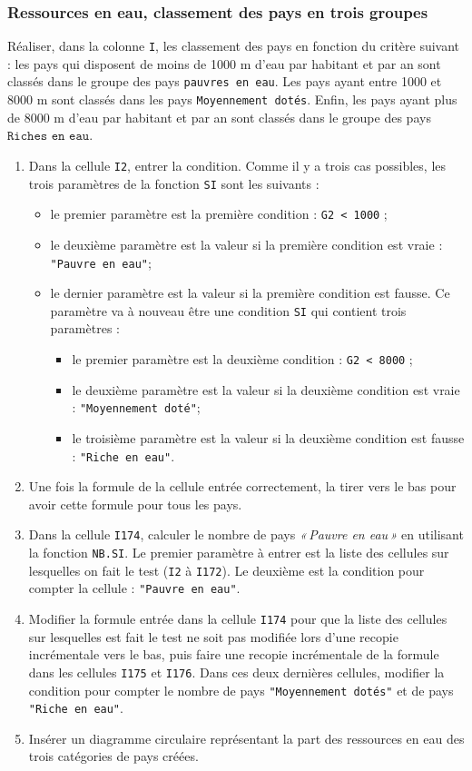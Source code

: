 \subsubsection{Ressources en eau, classement des pays en trois groupes}

Réaliser, dans la colonne \texttt{I}, les classement des pays en fonction du critère suivant : les pays qui disposent de moins de 1000 m d'eau par habitant et par an sont classés dans le groupe des pays \texttt{pauvres en eau}. Les pays ayant entre 1000 et 8000 m sont classés dans les pays \texttt{Moyennement dotés}. Enfin, les pays ayant plus de 8000 m d'eau par habitant et par an sont classés dans le groupe des pays $\texttt{Riches en eau}$.
\begin{enumerate}
\item Dans la cellule \texttt{I2}, entrer la condition. Comme il y a trois cas possibles, les trois paramètres de la fonction \texttt{SI} sont les suivants :
  \begin{itemize}
    \item le premier paramètre est la première condition : \texttt{G2 < 1000} ;
    \item le deuxième paramètre est la valeur si la première condition est vraie : \texttt{"Pauvre en eau"};
    \item le dernier paramètre est la valeur si la première condition est fausse. Ce paramètre va à nouveau être une condition \texttt{SI} qui contient trois paramètres :
\begin{itemize}
 \item le premier paramètre est la deuxième condition : \texttt{G2 < 8000} ;
 \item le deuxième paramètre est la valeur si la deuxième condition est vraie : \texttt{"Moyennement doté"};
 \item le troisième paramètre est la valeur si la deuxième condition est fausse : \texttt{"Riche en eau"}.
\end{itemize}  
  \end{itemize}
\item Une fois la formule de la cellule entrée correctement, la tirer vers le bas pour avoir cette formule pour tous les pays.
\item Dans la cellule \texttt{I174}, calculer le nombre de pays \emph{«\,Pauvre en eau\,»} en utilisant la fonction \texttt{NB.SI}. Le premier paramètre à entrer est la liste des cellules sur lesquelles on fait le test (\texttt{I2} à \texttt{I172}). Le deuxième est la condition pour compter la cellule : \texttt{"Pauvre en eau"}.
\item Modifier la formule entrée dans la cellule \texttt{I174} pour que la liste des cellules sur lesquelles est fait le test ne soit pas modifiée lors d'une recopie incrémentale vers le bas, puis faire une recopie incrémentale de la formule dans les cellules \texttt{I175} et \texttt{I176}. Dans ces deux dernières cellules, modifier la condition pour compter le nombre de pays \texttt{"Moyennement dotés"} et de pays \texttt{"Riche en eau"}.
\item Insérer un diagramme circulaire représentant la part des ressources en eau des trois catégories de pays créées.
\end{enumerate}
